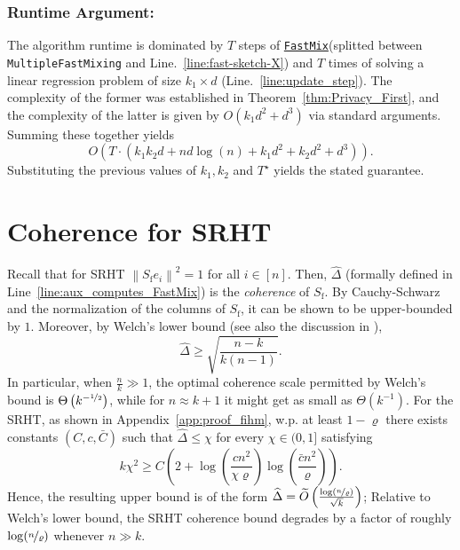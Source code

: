 \documentclass[11pt]{article}
\theoremstyle{definition}
\theoremstyle{plain}
\providecommand{\theoremref}[1]{Theorem~\ref{#1}}
\providecommand{\appendixref}[1]{Appendix~\ref{#1}}
\newcommand{\Norm}[1]{\left\| #1 \right\|}
\providecommand{\norm}[1]{\Norm{#1}}
\newcommand{\FastMix}{\hyperref[alg:fast_mixing]{\texttt{FastMix}}\xspace}
\begin{document}
\subsubsection{Runtime Argument:}
\label{app:proof_thm_linear_runtime}
The algorithm runtime is dominated by $T$ steps of \FastMix (splitted between \texttt{MultipleFastMixing} and Line.~\ref{line:fast-sketch-X}) and $T$ times of solving a linear regression problem of size $k_1\times d$ (Line.~\ref{line:update_step}). The complexity of the former was established in \theoremref{thm:Privacy_First}, and the complexity of the latter is given by $O\left(k_1d^2 + d^3\right)$ via standard arguments. Summing these together yields 
\begin{equation}
    \label{eq:runtime_asymptotic}
    O\left(T\cdot \left(k_1k_2d + nd\log(n) + k_1d^2 + k_2d^2 + d^3\right)\right).
\end{equation}
Substituting the previous values of $k_1, k_2 $ and $T^{\star}$ yields the stated guarantee. \hfill \qedsymbol
\section{Coherence for SRHT}
\label{app:srht_coherence}
Recall that for SRHT $\norm{S_{\mathrm{f}}e_i}^2 = 1$ for all $i\in[n]$. Then, $\widehat{\Delta}$ (formally defined in Line~\ref{line:aux_computes_FastMix}) is the \emph{coherence} of $S_{\mathrm{f}}$. By Cauchy-Schwarz and the normalization of the columns of $S_{\mathrm{f}}$, it can be shown to be upper-bounded by $1$. Moreover, by Welch's lower bound \citep[Theorem~1]{welch1974lower} (see also the discussion in \citet[Section~4.1]{haikin2021asymptotic}),
\begin{equation}
    \widehat{\Delta} \ge \sqrt{\frac{n-k}{k(n-1)}}.
\end{equation}
In particular, when $\frac{n}{k} \gg 1$, the optimal coherence scale permitted by Welch's bound is $\Theta\left(k^{-\nicefrac{1}{2}}\right)$, while for $n\approx k+1$ it might get as small as $\Theta\left(k^{-1}\right)$. For the SRHT, as shown in \appendixref{app:proof_fihm}, w.p. at least $1-\varrho$ there exists constants $(C, c, \bar{C})$ such that $\widehat{\Delta}\le \chi$ for every $\chi\in(0,1]$ satisfying
\begin{equation}
    k\chi^2 \ge C\left(2 + \log\left(\frac{cn^2}{\chi\varrho}\right)\log\left(\frac{\bar c n^2}{\varrho}\right)\right).
\end{equation}
Hence, the resulting upper bound is of the form $\widehat{\Delta}=\widetilde{O}\left(\frac{\log\left(\nicefrac{n}{\varrho}\right)}{\sqrt{k}}\right)$; Relative to Welch's lower bound, the SRHT coherence bound degrades by a factor of roughly $\log(\nicefrac{n}{\varrho})$ whenever $n\gg k$. 
\end{document}
